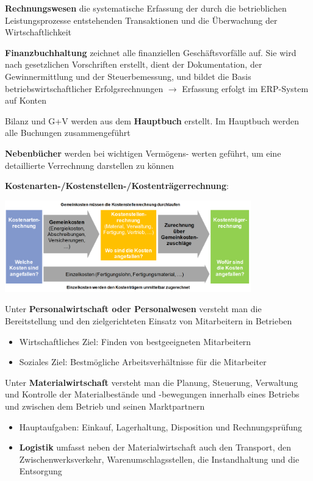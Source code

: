 \textbf{Rechnungswesen} die systematische Erfassung der durch die betrieblichen Leistungsprozesse entstehenden Transaktionen und die Überwachung der Wirtschaftlichkeit

\textbf{Finanzbuchhaltung} zeichnet alle finanziellen Geschäftsvorfälle auf. Sie wird nach gesetzlichen Vorschriften erstellt, dient der Dokumentation, der Gewinnermittlung und der Steuerbemessung, und bildet die Basis betriebswirtschaftlicher Erfolgsrechnungen $\rightarrow$ Erfassung erfolgt im ERP-System auf Konten

Bilanz und G+V werden aus dem \textbf{Hauptbuch} erstellt. Im Hauptbuch werden alle Buchungen zusammengeführt

\textbf{Nebenbücher} werden bei wichtigen Vermögens- werten geführt, um eine detaillierte Verrechnung darstellen zu können

\textbf{Kostenarten-/Kostenstellen-/Kostenträgerrechnung}: 
\begin{center}
	\includegraphics[width=0.8\textwidth]{images/kkk.png}
\end{center}

Unter \textbf{Personalwirtschaft oder Personalwesen} versteht man die Bereitstellung und den zielgerichteten Einsatz von Mitarbeitern in Betrieben
\begin{itemize}
	\item Wirtschaftliches Ziel: Finden von bestgeeigneten Mitarbeitern
	\item Soziales Ziel: Bestmögliche Arbeitsverhältnisse für die Mitarbeiter
\end{itemize}

Unter \textbf{Materialwirtschaft} versteht man die Planung, Steuerung, Verwaltung und Kontrolle der Materialbestände und -bewegungen innerhalb eines Betriebs und zwischen dem Betrieb und seinen Marktpartnern
\begin{itemize}
	\item Hauptaufgaben: Einkauf, Lagerhaltung, Disposition und Rechnungsprüfung
	\item \textbf{Logistik} umfasst neben der Materialwirtschaft auch den Transport, den Zwischenwerksverkehr, Warenumschlagsstellen, die Instandhaltung und die Entsorgung
\end{itemize}

